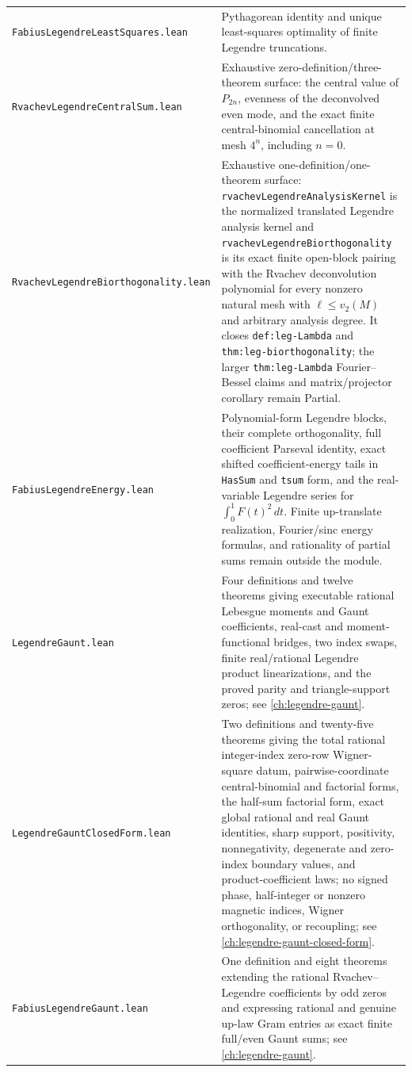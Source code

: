 \documentclass[11pt,oneside]{article}
\theoremstyle{definition}
\theoremstyle{remark}
\begin{document}
\begin{longtable}{>{\raggedright\arraybackslash}p{} >{\raggedright\arraybackslash}p{}}
\nolinkurl{FabiusLegendreLeastSquares.lean} & Pythagorean identity and unique least-squares optimality of finite Legendre truncations. \\
\nolinkurl{RvachevLegendreCentralSum.lean} & Exhaustive zero-definition/three-theorem surface: the central value of \(P_{2n}\), evenness of the deconvolved even mode, and the exact finite central-binomial cancellation at mesh \(4^n\), including \(n=0\). \\
\nolinkurl{RvachevLegendreBiorthogonality.lean} & Exhaustive one-definition/one-theorem surface: \nolinkurl{rvachevLegendreAnalysisKernel} is the normalized translated Legendre analysis kernel and \nolinkurl{rvachevLegendreBiorthogonality} is its exact finite open-block pairing with the Rvachev deconvolution polynomial for every nonzero natural mesh with \(\ell\leq v_2(M)\) and arbitrary analysis degree.  It closes \nolinkurl{def:leg-Lambda} and \nolinkurl{thm:leg-biorthogonality}; the larger \nolinkurl{thm:leg-Lambda} Fourier--Bessel claims and matrix/projector corollary remain Partial. \\
\nolinkurl{FabiusLegendreEnergy.lean} & Polynomial-form Legendre blocks, their complete orthogonality, full coefficient Parseval identity, exact shifted coefficient-energy tails in \nolinkurl{HasSum} and \nolinkurl{tsum} form, and the real-variable Legendre series for \(\int_0^1F(t)^2\,dt\).  Finite up-translate realization, Fourier/sinc energy formulas, and rationality of partial sums remain outside the module. \\
\nolinkurl{LegendreGaunt.lean} & Four definitions and twelve theorems giving executable rational Lebesgue moments and Gaunt coefficients, real-cast and moment-functional bridges, two index swaps, finite real/rational Legendre product linearizations, and the proved parity and triangle-support zeros; see \cref{ch:legendre-gaunt}. \\
\nolinkurl{LegendreGauntClosedForm.lean} & Two definitions and twenty-five theorems giving the total rational integer-index zero-row Wigner-square datum, pairwise-coordinate central-binomial and factorial forms, the half-sum factorial form, exact global rational and real Gaunt identities, sharp support, positivity, nonnegativity, degenerate and zero-index boundary values, and product-coefficient laws; no signed phase, half-integer or nonzero magnetic indices, Wigner orthogonality, or recoupling; see \cref{ch:legendre-gaunt-closed-form}. \\
\nolinkurl{FabiusLegendreGaunt.lean} & One definition and eight theorems extending the rational Rvachev--Legendre coefficients by odd zeros and expressing rational and genuine up-law Gram entries as exact finite full/even Gaunt sums; see \cref{ch:legendre-gaunt}. \\

\end{longtable}
\end{document}
